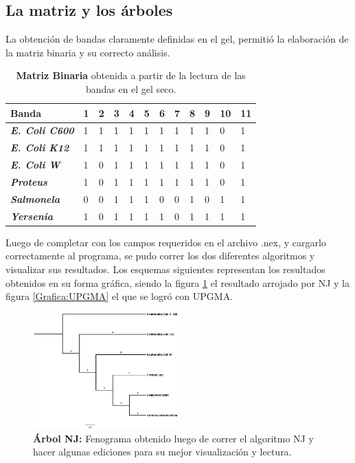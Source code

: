\documentclass[%
 reprint,
 amsmath,amssymb,
 aps,
showkeys,
letter,
12pts
]{revtex4-1}
\begin{document}
	\subsection{La matriz y los árboles}
		La obtención de bandas claramente definidas en el gel, permitió la elaboración de la matriz binaria y su correcto análisis.
		\begin{table}[h!]
			\centering
			\large
			\caption{\textbf{Matriz Binaria} obtenida a partir de la lectura de las bandas en el gel seco.}
			\label{tabla:Matriz}
			\begin{tabular}{|l||l|l|l|l|l|l|l|l|l|l|l|}
			\hline		
			\textbf{Banda} & \textbf{1} & \textbf{2} & \textbf{3} & \textbf{4} & \textbf{5} & \textbf{6} & \textbf{7} & \textbf{8} & \textbf{9} & \textbf{10} & \textbf{11}\\ \hline \hline
			\textbf{\textit{E. Coli C600}} & 1 & 1 & 1 & 1 & 1 & 1 & 1 & 1 & 1 & 0 & 1\\ \hline
			\textbf{\textit{E. Coli K12}}  & 1 & 1 & 1 & 1 & 1 & 1 & 1 & 1 & 1 & 0 & 1\\ \hline
			\textbf{\textit{E. Coli W}}    & 1 & 0 & 1 & 1 & 1 & 1 & 1 & 1 & 1 & 0 & 1\\ \hline
			\textbf{\textit{Proteus}}      & 1 & 0 & 1 & 1 & 1 & 1 & 1 & 1 & 1 & 0 & 1\\ \hline
			\textbf{\textit{Salmonela}}    & 0 & 0 & 1 & 1 & 1 & 0 & 0 & 1 & 0 & 1 & 1\\ \hline
			\textbf{\textit{Yersenia}}     & 1 & 0 & 1 & 1 & 1 & 1 & 0 & 1 & 1 & 1 & 1\\ \hline
			\end{tabular}
		\end{table}	
		
		Luego de completar con los campos requeridos en el archivo .nex, y cargarlo correctamente al programa, se pudo correr los dos diferentes algoritmos y visualizar sus resultados. Los esquemas siguientes representan los resultados obtenidos en su forma gráfica, siendo la figura \ref{Grafica:Nj} el resultado arrojado por NJ y la figura \ref{Grafica:UPGMA} el que se logró con UPGMA.
		
		\begin{figure}[h!]
		\includegraphics[width=0.5\textwidth]{arbolNJ.jpg}
		\caption{\textbf{Árbol NJ:} Fenograma obtenido luego de correr el algoritmo NJ y hacer algunas ediciones para su mejor visualización y lectura.}
		\label{Grafica:Nj}	
		\end{figure}
	
\end{document}
